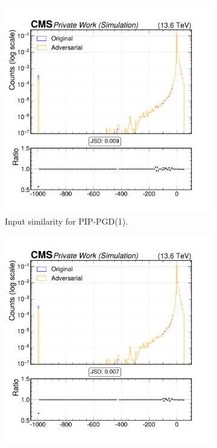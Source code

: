 \begin{figure}[h]
  \centering
  \begin{subfigure}[t]{0.32\textwidth}
    \includegraphics[width=\linewidth]{media/output/features/compare/combined_it_1/cmp_global_features_TagVarCSV_trackSip3dSigAboveCharm.pdf}
    \caption*{Input similarity for PIP-PGD(1).}
  \end{subfigure}\hfill
  \begin{subfigure}[t]{0.32\textwidth}
    \includegraphics[width=\linewidth]{media/output/features/compare/combined_it_2/cmp_global_features_TagVarCSV_trackSip3dSigAboveCharm.pdf}

\end{subfigure}
\end{figure}
